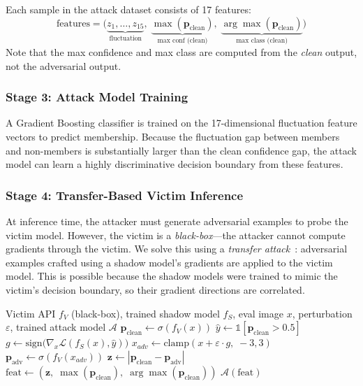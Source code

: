 \documentclass[conference]{IEEEtran}
\begin{document}
Each sample in the attack dataset consists of 17 features:
\begin{equation}
    \text{features} = \big(\underbrace{z_1, \ldots, z_{15}}_{\text{fluctuation}},\; \underbrace{\max(\mathbf{p}_{\text{clean}})}_{\text{max conf (clean)}},\; \underbrace{\arg\max(\mathbf{p}_{\text{clean}})}_{\text{max class (clean)}}\big)
\end{equation}
Note that the max confidence and max class are computed from the \textit{clean} output, not the adversarial output.

\subsubsection{Stage 3: Attack Model Training}

A Gradient Boosting classifier is trained on the 17-dimensional fluctuation feature vectors to predict membership. Because the fluctuation gap between members and non-members is substantially larger than the clean confidence gap, the attack model can learn a highly discriminative decision boundary from these features.

\subsubsection{Stage 4: Transfer-Based Victim Inference}

At inference time, the attacker must generate adversarial examples to probe the victim model. However, the victim is a \textit{black-box}---the attacker cannot compute gradients through the victim. We solve this using a \textit{transfer attack}~\cite{papernot2017practical}: adversarial examples crafted using a shadow model's gradients are applied to the victim model. This is possible because the shadow models were trained to mimic the victim's decision boundary, so their gradient directions are correlated.

\begin{algorithm}[t]
\caption{Fluctuation-Based MIA -- Inference}
\label{alg:fluctuation_mia}
\begin{algorithmic}[1]
\Require Victim API $f_V$ (black-box), trained shadow model $f_S$, eval image $x$, perturbation $\varepsilon$, trained attack model $\mathcal{A}$
\State $\mathbf{p}_{\text{clean}} \gets \sigma(f_V(x))$ 
\State $\hat{y} \gets \mathbb{1}[\mathbf{p}_{\text{clean}} > 0.5]$ 
\State $g \gets \text{sign}\big(\nabla_x \mathcal{L}(f_S(x), \hat{y})\big)$ 
\State $x_{adv} \gets \text{clamp}(x + \varepsilon \cdot g,\; -3, 3)$ 
\State $\mathbf{p}_{\text{adv}} \gets \sigma(f_V(x_{adv}))$ 
\State $\mathbf{z} \gets |\mathbf{p}_{\text{clean}} - \mathbf{p}_{\text{adv}}|$ 
\State $\text{feat} \gets (\mathbf{z},\; \max(\mathbf{p}_{\text{clean}}),\; \arg\max(\mathbf{p}_{\text{clean}}))$
\State \Return $\mathcal{A}(\text{feat})$ 
\end{algorithmic}
\end{algorithm}
\end{document}
